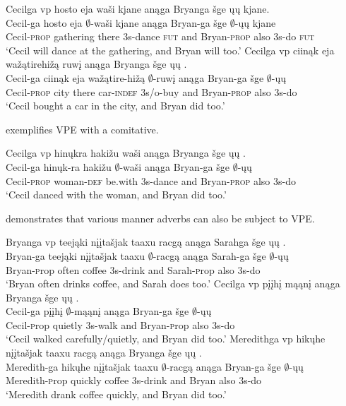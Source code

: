 \documentclass[output=paper]{LSP/langsci}
\begin{document}
\ea\label{ex:johnson:8}
\ea 
\glll Cecilga {\ob}{vp} hosto eja waši{\cb} kjane anąga Bryanga šge {\ob}ųų{\cb} kjane.\\
Cecil-ga {} hosto eja $\emptyset$-waši kjane anąga Bryan-ga šge $\emptyset$-ųų kjane\\
Cecil-\textsc{prop} {} gathering there {\textsc 3s}-dance \textsc{fut} and Bryan-\textsc{prop} also {\textsc 3s}-do \textsc{fut}\\
\trans `Cecil will dance at the gathering, and Bryan will too.'
\ex 
\glll Cecilga {\ob}{vp} ciinąk eja wažątirehižą ruwį{\cb} anąga Bryanga šge {\ob}ųų{\cb} .\\
Cecil-ga {} ciinąk eja wažątire-hižą $\emptyset$-ruwį anąga Bryan-ga šge $\emptyset$-ųų\\
Cecil-\textsc{prop} {} city there car-\textsc{indef} {\textsc 3s/o}-buy and Bryan-\textsc{prop} also {\textsc 3s}-do\\
\trans `Cecil bought a car in the city, and Bryan did too.'
\z
\z

 exemplifies VPE with a comitative.
 
\ea\label{ex:johnson:9} 
\glll Cecilga {\ob}{vp} hinųkra hakižu waši{\cb} anąga Bryanga šge {\ob}ųų{\cb} .\\
Cecil-ga {} hinųk-ra hakižu $\emptyset$-waši anąga Bryan-ga šge $\emptyset$-ųų\\
Cecil-\textsc{prop} {} woman-\textsc{def} be.with {\textsc 3s}-dance and Bryan-\textsc{prop} also {\textsc 3s}-do\\
\trans `Cecil danced with the woman, and Bryan did too.'
\z

 demonstrates that various manner adverbs can also be subject to VPE.
 
\ea\label{ex:johnson:10}
\ea 
\glll Bryanga  {\ob}{vp} teejąki {nįįtašjak taaxu} racgą{\cb} anąga Sarahga šge {\ob}ųų{\cb} .\\ 
Bryan-ga {} teejąki {nįįtašjak taaxu} $\emptyset$-racgą anąga Sarah-ga šge $\emptyset$-ųų\\
Bryan-{\textsc prop} {} often coffee {\textsc 3s}-drink and Sarah-{\textsc prop} also {\textsc 3s}-do\\
\trans `Bryan often drinks coffee, and Sarah does too.'
\ex 
\glll Cecilga  {\ob}{vp} pįįhį mąąnį{\cb} anąga Bryanga šge {\ob}ųų{\cb} .\\
Cecil-ga {} pįįhį $\emptyset$-mąąnį anąga Bryan-ga šge $\emptyset$-ųų\\
Cecil-{\textsc prop} {} quietly {\textsc 3s}-walk and Bryan-{\textsc prop} also {\textsc 3s}-do\\
\trans `Cecil walked carefully/quietly, and Bryan did too.'
\ex 
\glll Meredithga {\ob}{vp} hikųhe {nįįtašjak taaxu} racgą{\cb} anąga Bryanga šge {\ob}ųų{\cb} .\\
Meredith-ga {} hikųhe {nįįtašjak taaxu} $\emptyset$-racgą anąga Bryan-ga šge $\emptyset$-ųų\\
Meredith-{\textsc prop} {} quickly coffee {\textsc 3s}-drink and Bryan also {\textsc 3s}-do\\
\trans `Meredith drank coffee quickly, and Bryan did too.'
\z
\z
\end{document}
